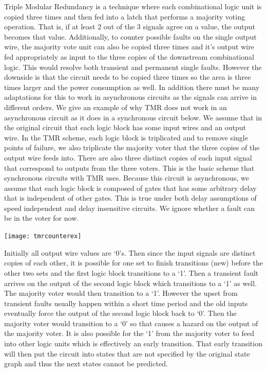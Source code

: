 \documentclass[12pt]{report}
\begin{document}
Triple Modular Redundancy is a technique where each combinational logic unit is copied three times and then fed into a latch that performs a majority voting operation.  That is, if at least 2 out of the 3 signals agree on a value, the output becomes that value.  Additionally, to counter possible faults on the single output wire, the majority vote unit can also be copied three times and it's output wire fed appropriately as input to the three copies of the downstream combinational logic.  This would resolve both transient and permanent single faults.  However the downside is that the circuit needs to be copied three times so the area is three times larger and the power consumption as well.  In addition there must be many adaptations for this to work in asynchronous circuits as the signals can arrive in different orders.  We give an example of why TMR does not work in an asynchronous circuit as it does in a synchronous circuit below.  We assume that in the original circuit that each logic block has some input wires and an output wire.  In the TMR scheme, each logic block is triplicated and to remove single points of failure, we also triplicate the majority voter that the three copies of the output wire feeds into.  There are also three distinct copies of each input signal that correspond to outputs from the three voters.  This is the basic scheme that synchronous circuits with TMR uses.  Because this circuit is asynchronous, we assume that each logic block is composed of gates that has some arbitrary delay that is independent of other gates.  This is true under both delay assumptions of speed independent and delay insensitive circuits.  We ignore whether a fault can be in the voter for now. 
\begin{center}
\texttt{[image: tmrcounterex]}
\end{center}
Initially all output wire values are `0's.  Then since the input signals are distinct copies of each other, it is possible for one set to finish transitions (new) before the other two sets and the first logic block transitions to a `1'.  Then a transient fault arrives on the output of the second logic block which transitions to a `1' as well.  The majority voter would then transition to a `1'.  However the upset from transient faults usually happen within a short time period and the old inputs eventually force the output of the second logic block back to `0'.  Then the majority voter would transition to a `0' so that causes a hazard on the output of the majority voter.  %
It is also possible for the `1' from the majority voter to feed into other logic units which is effectively an early transition.  That early transition will then put the circuit into states that are not specified by the original state graph and thus the next states cannot be predicted.
\\
\end{document}
